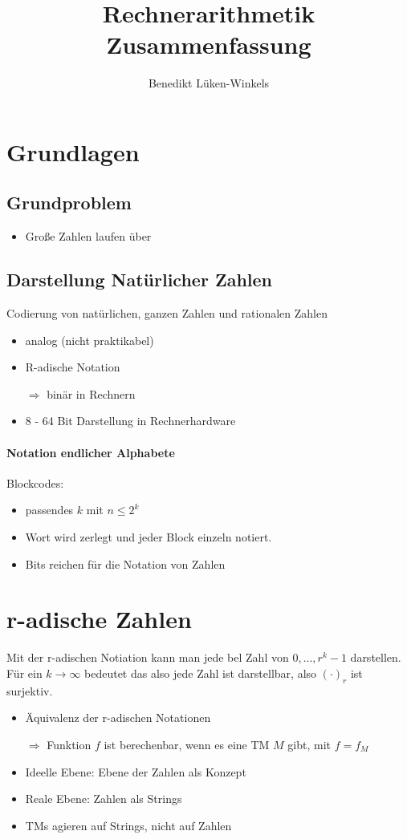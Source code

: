 \documentclass{scrartcl}
\title{Rechnerarithmetik \\Zusammenfassung}
\author{Benedikt Lüken-Winkels}
\begin{document}
\maketitle
\tableofcontents
\newpage

%
%

\section{Grundlagen}

\subsection{Grundproblem}
\begin{itemize}
\item Große Zahlen laufen über 
\end{itemize}

\subsection{Darstellung Natürlicher Zahlen}
Codierung von natürlichen, ganzen Zahlen und rationalen Zahlen
\begin{itemize}
\item analog (nicht praktikabel)
\item R-adische Notation
\item[$\Rightarrow$] binär in Rechnern
\item 8 - 64 Bit Darstellung in Rechnerhardware
\end{itemize}

\paragraph{Notation endlicher Alphabete}
Blockcodes:
\begin{itemize}
\item passendes $k$ mit $n \leq 2^k$
\item Wort wird zerlegt und jeder Block einzeln notiert.
\item Bits reichen für die Notation von Zahlen
\end{itemize} 

%
%

\section{r-adische Zahlen}
Mit der r-adischen Notiation kann man jede bel Zahl von $0,...,r^k - 1$ darstellen. Für ein $k\rightarrow \infty$ bedeutet das also jede Zahl ist darstellbar, also $(\cdot)_r$ ist surjektiv.
\begin{itemize}
\item Äquivalenz der r-adischen Notationen
\item[$\Rightarrow$] Funktion $f$ ist berechenbar, wenn es eine TM $M$ gibt, mit $f=f_M$
\item Ideelle Ebene: Ebene der Zahlen als Konzept 
\item Reale Ebene: Zahlen als Strings
\item TMs agieren auf Strings, nicht auf Zahlen
\end{itemize}
\end{document}
